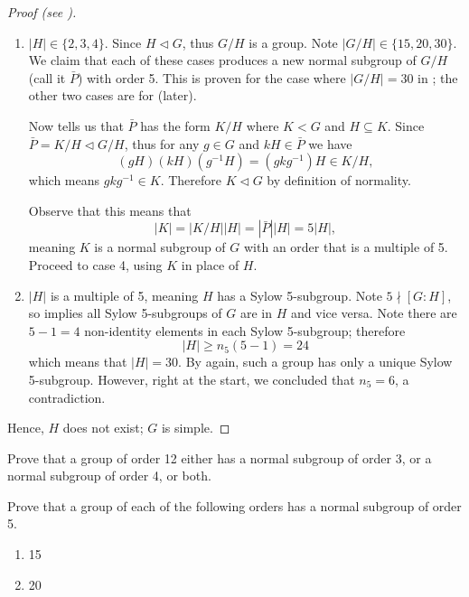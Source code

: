 \begin{proof}[Proof (see {\cite[p.~145, Proposition 21]{dummit_foote_2004}})]
\begin{enumerate}
        \item $|H| \in \{2, 3, 4\}$. Since $H \lhd G$, thus $G/H$ is a group. Note $|G/H| \in \{15, 20, 30\}$. We claim that each of these cases produces a new normal subgroup of $G/H$ (call it $\bar{P}$) with order 5. This is proven for the case where $|G/H| = 30$ in ; the other two cases are for  (later).

        Now  tells us that $\bar{P}$ has the form $K/H$ where $K < G$ and $H \subseteq K$. Since $\bar{P} = K/H \lhd G/H$, thus for any $g \in G$ and $kH \in \bar{P}$ we have
        \[
            (gH)(kH)(g^{-1}H) = (gkg^{-1})H \in K/H,
        \]
        which means $gkg^{-1} \in K$. Therefore $K \lhd G$ by definition of normality.

        Observe that this means that
        \[
            |K| = |K/H||H| = |\bar{P}||H| = 5|H|,    
        \]
        meaning $K$ is a normal subgroup of $G$ with an order that is a multiple of 5. Proceed to case 4, using $K$ in place of $H$.

        \item $|H|$ is a multiple of 5, meaning $H$ has a Sylow 5-subgroup. Note $5 \nmid [G:H]$, so  implies all Sylow 5-subgroups of $G$ are in $H$ and vice versa. Note there are $5-1=4$ non-identity elements in each Sylow 5-subgroup; therefore
        \[
            |H| \geq n_5(5-1) = 24
        \]
        which means that $|H| = 30$. By  again, such a group has only a unique Sylow 5-subgroup. However, right at the start, we concluded that $n_5 = 6$, a contradiction.
    \end{enumerate}
    Hence, $H$ does not exist; $G$ is simple.
\end{proof}

\begin{exercise}\label{exercise-group-of-order-12-has-normal-subgroup-of-3-or-4}
    Prove that a group of order 12 either has a normal subgroup of order 3, or a normal subgroup of order 4, or both.
\end{exercise}

\begin{exercise}\label{exercise-group-of-order-15-or-20-has-normal-subgroup-of-order-5}
    Prove that a group of each of the following orders has a normal subgroup of order 5.
    \begin{enumerate}[label=(\alph*)]
        \item 15
        \item 20
    \end{enumerate}
\end{exercise}

